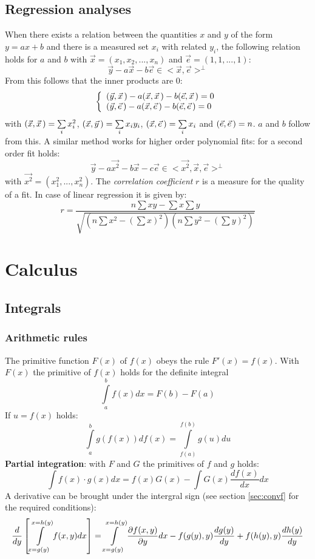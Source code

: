 \documentclass[a4paper,fancyheadings,twoside]{report}
\begin{document}
\section{Regression analyses}
When there exists a relation between the quantities $x$ and $y$ of the form
$y=ax+b$ and there is a measured set $x_i$ with related $y_i$, the following
relation holds for $a$ and $b$ with $\vec{x}=(x_1,x_2,...,x_n)$ and
$\vec{e}=(1,1,...,1)$:
\[
\vec{y}-a\vec{x}-b\vec{e}\in<\vec{x},\vec{e}>^\perp
\]
From this follows that the inner products are 0:
\[
\left\{
\begin{array}{l}
(\vec{y},\vec{x}\,)-a(\vec{x},\vec{x}\,)-b(\vec{e},\vec{x}\,)=0\\
(\vec{y},\vec{e}\,)-a(\vec{x},\vec{e}\,)-b(\vec{e},\vec{e}\,)=0
\end{array}\right.
\]
with $(\vec{x},\vec{x}\,)=\sum\limits_i x_i^2$, $(\vec{x},\vec{y}\,)=\sum\limits_ix_iy_i$,
$(\vec{x},\vec{e}\,)=\sum\limits_ix_i$ and $(\vec{e},\vec{e}\,)=n$.
$a$ and $b$ follow from this.
\npar
A similar method works for higher order polynomial fits: for a second order
fit holds:
\[
\vec{y}-a\vec{x^2}-b\vec{x}-c\vec{e}\in<\vec{x^2},\vec{x},\vec{e}>^\perp
\]
with $\vec{x^2}=(x_1^2,...,x_n^2)$.
\npar
The {\it correlation coefficient} $r$ is a measure for the quality of a fit.
In case of linear regression it is given by:
\[
r=\frac{n\sum xy-\sum x\sum y}{\sqrt{(n\sum x^2-(\sum x)^2)(n\sum y^2-(\sum y)^2)}}
\]


\chapter{Calculus}
\section{Integrals}
\subsection{Arithmetic rules}
The primitive function $F(x)$ of $f(x)$ obeys the rule $F'(x)=f(x)$. With
$F(x)$ the primitive of $f(x)$ holds for the definite integral
\[
\int\limits_a^bf(x)dx=F(b)-F(a)
\]
If $u=f(x)$ holds:
\[
\int\limits_a^bg(f(x))df(x)=\int\limits_{f(a)}^{f(b)}g(u)du
\]
{\bf Partial integration}: with $F$ and $G$ the primitives of $f$ and $g$
holds:
\[
\int f(x)\cdot g(x)dx=f(x)G(x)-\int G(x)\frac{df(x)}{dx}dx
\]
A derivative can be brought under the intergral sign (see section
\ref{sec:convf} for the required conditions):
\[
\frac{d}{dy}\left[\int\limits_{x=g(y)}^{x=h(y)}f(x,y)dx\right]=
\int\limits_{x=g(y)}^{x=h(y)}\frac{\partial f(x,y)}{\partial y}dx-f(g(y),y)\frac{dg(y)}{dy}+f(h(y),y)\frac{dh(y)}{dy}
\]
\end{document}
